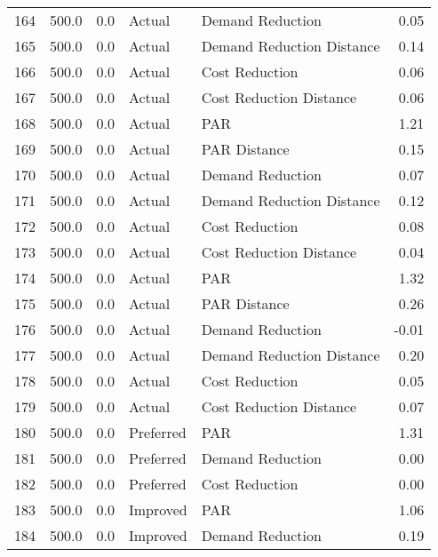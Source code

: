 \begin{longtable}{lrrllr}
164  &        500.0 &     0.0 &         Actual &           Demand Reduction &   0.05 \\
165  &        500.0 &     0.0 &         Actual &  Demand Reduction Distance &   0.14 \\
166  &        500.0 &     0.0 &         Actual &             Cost Reduction &   0.06 \\
167  &        500.0 &     0.0 &         Actual &    Cost Reduction Distance &   0.06 \\
168  &        500.0 &     0.0 &         Actual &                        PAR &   1.21 \\
169  &        500.0 &     0.0 &         Actual &               PAR Distance &   0.15 \\
170  &        500.0 &     0.0 &         Actual &           Demand Reduction &   0.07 \\
171  &        500.0 &     0.0 &         Actual &  Demand Reduction Distance &   0.12 \\
172  &        500.0 &     0.0 &         Actual &             Cost Reduction &   0.08 \\
173  &        500.0 &     0.0 &         Actual &    Cost Reduction Distance &   0.04 \\
174  &        500.0 &     0.0 &         Actual &                        PAR &   1.32 \\
175  &        500.0 &     0.0 &         Actual &               PAR Distance &   0.26 \\
176  &        500.0 &     0.0 &         Actual &           Demand Reduction &  -0.01 \\
177  &        500.0 &     0.0 &         Actual &  Demand Reduction Distance &   0.20 \\
178  &        500.0 &     0.0 &         Actual &             Cost Reduction &   0.05 \\
179  &        500.0 &     0.0 &         Actual &    Cost Reduction Distance &   0.07 \\
180  &        500.0 &     0.0 &      Preferred &                        PAR &   1.31 \\
181  &        500.0 &     0.0 &      Preferred &           Demand Reduction &   0.00 \\
182  &        500.0 &     0.0 &      Preferred &             Cost Reduction &   0.00 \\
183  &        500.0 &     0.0 &       Improved &                        PAR &   1.06 \\
184  &        500.0 &     0.0 &       Improved &           Demand Reduction &   0.19 \\

\end{longtable}
